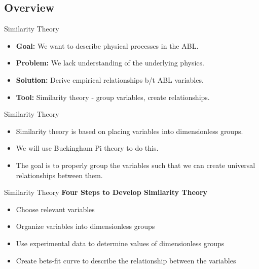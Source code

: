 \subsection{Overview}
\begin{frame}{Similarity Theory}
\begin{itemize}
	\item \textbf{Goal:} We want to describe physical processes in the ABL.
	\item \textbf{Problem:} We lack understanding of the underlying physics.
	\item \textbf{Solution:} Derive empirical relationships b/t ABL variables.
	\item \textbf{Tool:} Similarity theory - group variables, create relationships.
\end{itemize}
\end{frame}
\begin{frame}{Similarity Theory}
\begin{itemize}
	\item Similarity theory is based on placing variables into dimensionless groups.
	\item We will use Buckingham Pi theory to do this.
	\item The goal is to properly group the variables such that we can create universal relationships between them.
\end{itemize}
\end{frame}
\begin{frame}{Similarity Theory}
\textbf{Four Steps to Develop Similarity Theory}
\begin{itemize}
	\item Choose relevant variables
	\item Organize variables into dimensionless groups
	\item Use experimental data to determine values of dimensionless groups
	\item Create bets-fit curve to describe the relationship between the variables
\end{itemize}
\end{frame}
